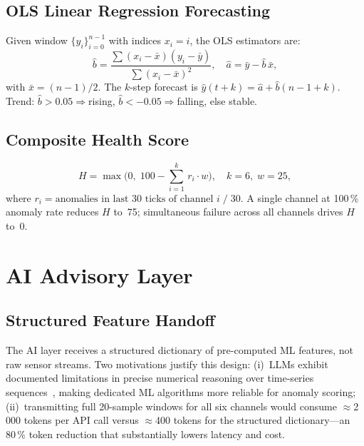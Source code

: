 \documentclass[journal,10pt,twocolumn]{IEEEtran}
\begin{document}
\subsection{OLS Linear Regression Forecasting}

Given window $\{y_i\}_{i=0}^{n-1}$ with indices $x_i{=}i$, the OLS
estimators are:
\begin{equation}
  \hat b = \frac{\sum(x_i-\bar x)(y_i-\bar y)}{\sum(x_i-\bar x)^2},
  \quad
  \hat a = \bar y - \hat b\,\bar x,
  \label{eq:ols}
\end{equation}
with $\bar x{=}(n{-}1)/2$.
The $k$-step forecast is $\hat y(t+k) = \hat a + \hat b(n{-}1+k)$.
Trend: $\hat b{>}0.05\Rightarrow$rising, $\hat b{<}-0.05\Rightarrow$falling,
else stable.

\subsection{Composite Health Score}

\begin{equation}
  H = \max\!\bigl(0,\;100 - {\textstyle\sum_{i=1}^{k}}\, r_i \cdot w\bigr),
  \quad k=6,\; w=25,
  \label{eq:health}
\end{equation}
where $r_i=\text{anomalies in last 30 ticks of channel }i\;/\;30$.
A single channel at 100\,\% anomaly rate reduces $H$ to~75; simultaneous
failure across all channels drives $H$ to~0.

\section{AI Advisory Layer}
\label{sec:ai}

\subsection{Structured Feature Handoff}

The AI layer receives a structured dictionary of pre-computed ML
features, not raw sensor streams.
Two motivations justify this design:
(i)~LLMs exhibit documented limitations in precise numerical reasoning
over time-series sequences~\cite{Wei2022}, making dedicated ML algorithms
more reliable for anomaly scoring;
(ii)~transmitting full 20-sample windows for all six channels would
consume $\approx$2\,000 tokens per API call versus $\approx$400 tokens
for the structured dictionary---an 80\,\% token reduction that
substantially lowers latency and cost.
\end{document}
